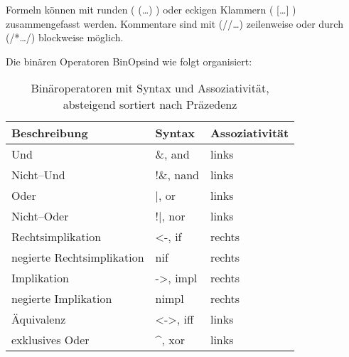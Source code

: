 \documentclass[ngerman,a4paper,abstracton,open=right,twoside=false,toc=listofnumbered,bibtotocnumbered]{scrreprt}
\begin{document}
Formeln können mit runden ( (\dots) ) oder eckigen Klammern ( [\dots] ) zusammengefasst werden. Kommentare sind mit (//\dots) zeilenweise oder durch (/*\dots */) blockweise möglich.

Die binären Operatoren \glqq BinOp\grqq sind wie folgt organisiert:

\begin{table}[h]
	\begin{tabular}{|l|l|l|}
		\hline
		\textbf{Beschreibung} & \textbf{Syntax} & \textbf{Assoziativität} \\
		\hline
		Und & \&, and & links \\ \hline
		Nicht--Und & !\&, nand & links \\ \hline
		Oder & |, or & links \\ \hline
		Nicht--Oder & !|, nor & links \\ \hline
		Rechtsimplikation & <-, if & rechts \\ \hline
		negierte Rechtsimplikation & nif & rechts \\ \hline
		Implikation & ->, impl & rechts \\ \hline
		negierte Implikation & nimpl & rechts \\ \hline
		Äquivalenz & <->, iff & links \\ \hline
		exklusives Oder & \textasciicircum, xor & links \\ \hline
	\end{tabular}
	\caption{Binäroperatoren mit Syntax und Assoziativität, absteigend sortiert nach Präzedenz}
\end{table}
\end{document}
